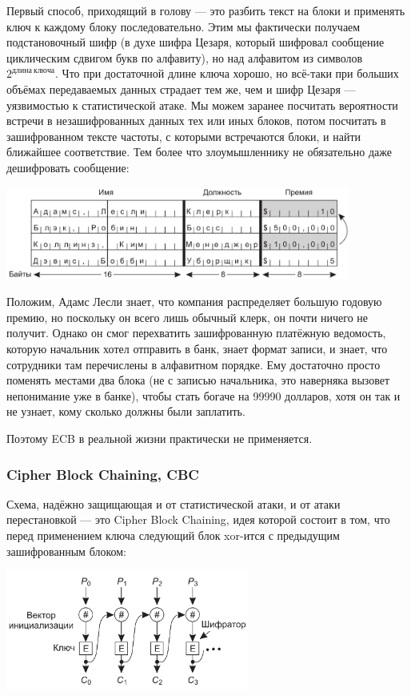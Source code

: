 \documentclass{../mcstext}
\begin{document}
Первый способ, приходящий в голову --- это разбить текст на блоки и применять ключ к каждому блоку последовательно. Этим мы фактически получаем подстановочный шифр (в духе шифра Цезаря, который шифровал сообщение циклическим сдвигом букв по алфавиту), но над алфавитом из символов $2^{длина\ ключа}$. Что при достаточной длине ключа хорошо, но всё-таки при больших объёмах передаваемых данных страдает тем же, чем и шифр Цезаря --- уязвимостью к статистической атаке. Мы можем заранее посчитать вероятности встречи в незашифрованных данных тех или иных блоков, потом посчитать в зашифрованном тексте частоты, с которыми встречаются блоки, и найти ближайшее соответствие. Тем более что злоумышленнику не обязательно даже дешифровать сообщение: 

\begin{center}
    \includegraphics[width=0.85\textwidth]{ecbAttack.png}
\end{center}

Положим, Адамс Лесли знает, что компания распределяет большую годовую премию, но поскольку он всего лишь обычный клерк, он почти ничего не получит. Однако он смог перехватить зашифрованную платёжную ведомость, которую начальник хотел отправить в банк, знает формат записи, и знает, что сотрудники там перечислены в алфавитном порядке. Ему достаточно просто поменять местами два блока (не с записью начальника, это наверняка вызовет непонимание уже в банке), чтобы стать богаче на 99990 долларов, хотя он так и не узнает, кому сколько должны были заплатить.

Поэтому ECB в реальной жизни практически не применяется.

\subsubsection{Cipher Block Chaining, CBC}

Схема, надёжно защищающая и от статистической атаки, и от атаки перестановкой --- это Cipher Block Chaining, идея которой состоит в том, что перед применением ключа следующий блок xor-ится с предыдущим зашифрованным блоком:

\begin{center}
    \includegraphics[width=0.6\textwidth]{cbc.png}
\end{center}
\end{document}
